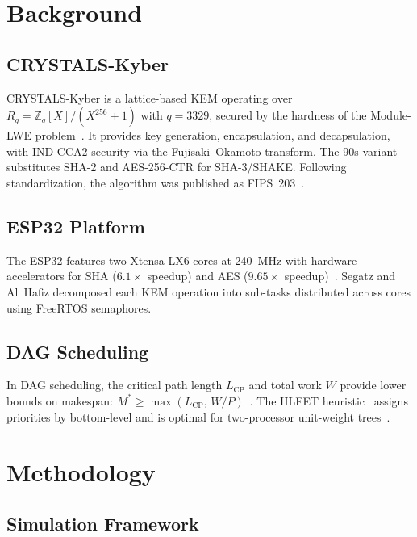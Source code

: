 \documentclass[conference]{IEEEtran}
\begin{document}
\section{Background}

\subsection{CRYSTALS-Kyber}

CRYSTALS-Kyber is a lattice-based KEM operating over $R_q = \mathbb{Z}_q[X]/(X^{256}+1)$ with $q = 3329$, secured by the hardness of the Module-LWE problem~\cite{kyber2021}. It provides key generation, encapsulation, and decapsulation, with IND-CCA2 security via the Fujisaki--Okamoto transform. The 90s variant substitutes SHA-2 and AES-256-CTR for SHA-3/SHAKE. Following standardization, the algorithm was published as FIPS~203~\cite{fips203}.

\subsection{ESP32 Platform}

The ESP32 features two Xtensa LX6 cores at 240~MHz with hardware accelerators for SHA ($6.1\times$ speedup) and AES ($9.65\times$ speedup)~\cite{esp32trm, segatz2022}. Segatz and Al~Hafiz decomposed each KEM operation into sub-tasks distributed across cores using FreeRTOS semaphores.

\subsection{DAG Scheduling}

In DAG scheduling, the critical path length $L_{\mathrm{CP}}$ and total work $W$ provide lower bounds on makespan: $M^{*} \geq \max(L_{\mathrm{CP}},\, W/P)$~\cite{graham1969}. The HLFET heuristic~\cite{kwok1999, adam1974} assigns priorities by bottom-level and is optimal for two-processor unit-weight trees~\cite{coffman1972}.

\section{Methodology}

\subsection{Simulation Framework}
\end{document}
